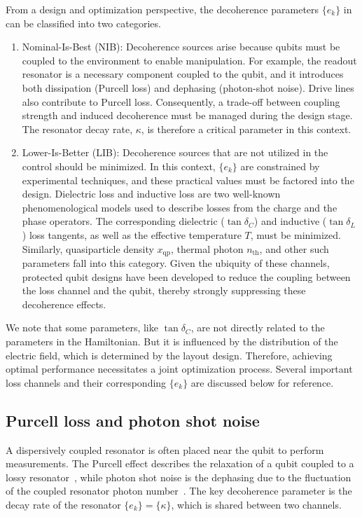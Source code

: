 \documentclass[a4paper,onecolumn,11pt,unpublished]{quantumarticle}
\newcommand{\setelem}[1]{\ensuremath{\{#1\}}}
\newcommand{\xqp}{x_{\text{qp}}}
\newcommand{\nth}{n_{\text{th}}}
\begin{document}
From a design and optimization perspective, the decoherence parameters $\setelem{e_k}$ in~ can be classified into two categories.
\begin{enumerate}
  \item Nominal-Is-Best (NIB): Decoherence sources arise because qubits must be coupled to the environment to enable manipulation. For example, the readout resonator is a necessary component coupled to the qubit, and it introduces both dissipation (Purcell loss) and dephasing (photon-shot noise). Drive lines also contribute to Purcell loss. Consequently, a trade-off between coupling strength and induced decoherence must be managed during the design stage. The resonator decay rate, $\kappa$, is therefore a critical parameter in this context.
  \item Lower-Is-Better (LIB): Decoherence sources that are not utilized in the control should be minimized. In this context, $\setelem{e_k}$ are constrained by experimental techniques, and these practical values must be factored into the design. Dielectric loss and inductive loss are two well-known phenomenological models used to describe losses from the charge and the phase operators. The corresponding dielectric ($\tan\delta_C$) and inductive ($\tan\delta_L$) loss tangents, as well as the effective temperature $T$, must be minimized. Similarly, quasiparticle density $\xqp$, thermal photon $\nth$, and other such parameters fall into this category. Given the ubiquity of these channels, protected qubit designs have been developed to reduce the coupling between the loss channel and the qubit, thereby strongly suppressing these decoherence effects.
\end{enumerate}

We note that some parameters, like $\tan\delta_C$, are not directly related to the parameters in the Hamiltonian. But it is influenced by the distribution of the electric field, which is determined by the layout design. Therefore, achieving optimal performance necessitates a joint optimization process. Several important loss channels and their corresponding $\setelem{e_k}$ are discussed below for reference.

\subsection{Purcell loss and photon shot noise}
A dispersively coupled resonator is often placed near the qubit to perform measurements. The Purcell effect describes the relaxation of a qubit coupled to a lossy resonator~\cite{Houck2008Controlling,Johnson2011Controlling,Sete2014Purcell}, while photon shot noise is the dephasing due to the fluctuation of the coupled resonator photon number~\cite{Gambetta2006Qubitphoton,Clerk2007Using,Rigetti2012Superconducting,Zhang2017Suppression,Kou2017FluxoniumBased}. The key decoherence parameter is the decay rate of the resonator $\setelem{e_k}=\setelem{\kappa}$, which is shared between two channels.
\end{document}

